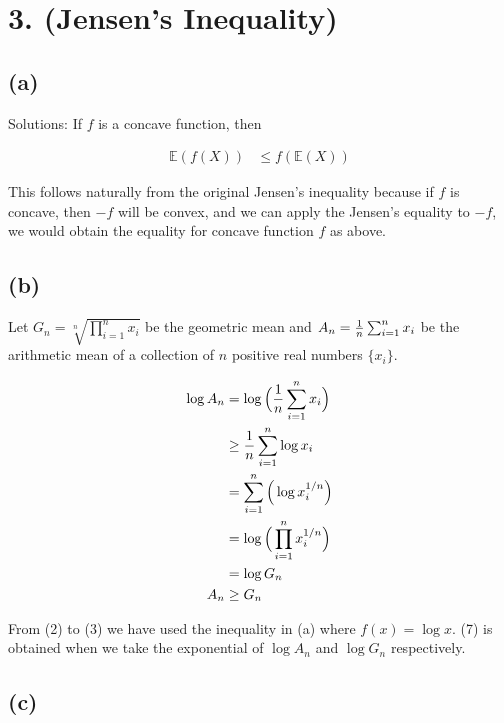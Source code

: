 \documentclass[10pt]{537homework}
\author{Peilun Dai}
\begin{document}
\section*{3. (Jensen's Inequality) }


\subsection*{(a)} Solutions: If $f$ is a concave function, then 

\begin{align}
  \mathbb{E}(f(X)) & \leq f(\mathbb{E}(X))
\end{align}

This follows naturally from the original Jensen's inequality because if $f$ is concave, then $-f$ will be convex, and we can apply the Jensen's equality to $-f$, we would obtain the equality for concave function $f$ as above. 


\subsection*{(b)} \proof 

Let $G_n = \sqrt[n]{\prod_{i=1}^n x_i}$ be the geometric mean and $A_n = {1\over n}\sum_{i=1}^n x_i$ be the arithmetic mean of a collection of $n$ positive real numbers $\{x_i\}$.

\begin{align}
  \log{A_n}   & = \log{\Big({1 \over n} \sum_{i=1}^n x_i \Big)} \\
              & \geq {1 \over n} \sum_{i=1}^n \log{x_i} \\
              & = \sum_{i=1}^n \Big( \log{x_i^{1/n}} \Big) \\
              & = \log{\Big( \prod_{i=1}^n x_i^{1/n} \Big)} \\
              & = \log{G_n} \\
        A_n   & \geq G_n 
\end{align}

From (2) to (3) we have used the inequality in (a) where $f(x) = \log{x}$. (7) is obtained when we take the exponential of $\log{A_n}$ and $\log{G_n}$ respectively. 


\subsection*{(c)} \proof 
\end{document}
